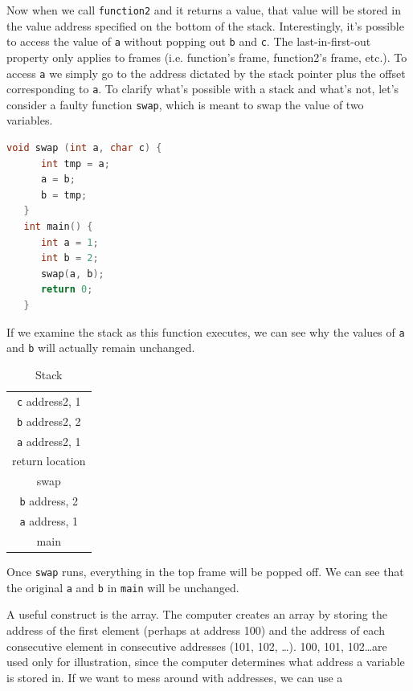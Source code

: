 \documentclass[nobib]{tufte-handout}
\begin{document}
Now when we call \texttt{function2} and it returns a value, that value will 
be stored in the value address specified on the bottom of the stack. 
Interestingly, it's possible to access the value of \texttt{a} without popping out 
\texttt{b} and \texttt{c}. The last-in-first-out property only applies to frames (i.e. function's frame,
function2's frame, etc.). To access \texttt{a} we simply go to the address dictated by the stack pointer
plus the offset corresponding to \texttt{a}. To clarify what's possible with a stack and what's 
not, let's consider a faulty function \texttt{swap}, which is meant to swap the value of two variables. 
\begin{lstlisting}[language=C,caption=Swap]
   void swap (int a, char c) {
      int tmp = a;
      a = b;
      b = tmp;
   }
   int main() {
      int a = 1;
      int b = 2;
      swap(a, b);
      return 0;
   }
\end{lstlisting}
If we examine the stack as this function executes, we can see why the values 
of \texttt{a} and \texttt{b} will actually remain unchanged. 
\begin{table}[h]
   \centering
   \caption{Stack}
   \label{table:stackswap}
   \begin{tabular}{|c|}
   \hline
   \texttt{c} address2, 1 \\
   \texttt{b} address2, 2 \\
   \texttt{a} address2, 1 \\
   return location \\
   swap\\
   \hline
   \texttt{b} address, 2 \\
   \texttt{a} address, 1 \\
   main \\
   \hline
   \end{tabular}
\end{table}
Once \texttt{swap} runs, everything in the top frame will be popped off.
We can see that the original \texttt{a} and \texttt{b} in \texttt{main} will be unchanged. 

A useful construct is the array. The computer creates an array by storing 
the address of the first element (perhaps at address 100) and the address of each 
consecutive element in consecutive addresses (101, 102, \dots). 100, 101, 102\dots are 
used only for illustration, since the computer determines what address 
a variable is stored in. If we want to mess around with addresses, we can use a
\end{document}
